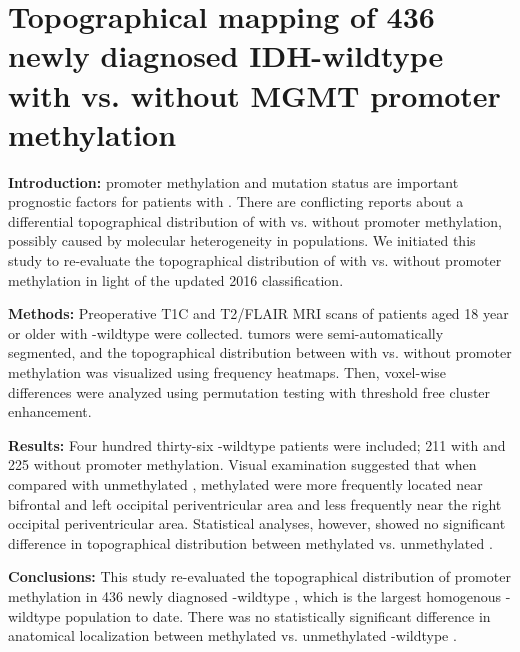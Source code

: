 \chapter[Topographical mapping of 436 newly diagnosed IDH-wildtype glioblastoma with vs. without MGMT promoter methylation][Glioblastoma topographical mapping]{Topographical mapping of 436 newly diagnosed IDH-wildtype  with vs. without MGMT promoter methylation}\label{chap:HGGLocation}


\begin{ChapterAbstract}
    \textbf{Introduction:}  promoter methylation and  mutation status are important prognostic factors for patients with .
    There are conflicting reports about a differential topographical distribution of  with vs. without  promoter methylation, possibly caused by molecular heterogeneity in  populations.
    We initiated this study to re-evaluate the topographical distribution of  with vs. without  promoter methylation in light of the updated  2016 classification.

    \textbf{Methods:} Preoperative \acrlong{T1C} and \acrlong{T2}/\acrlong{FLAIR} \acrlong{MRI} scans of patients aged 18 year or older with -wildtype  were collected.
    \Glspl{tumor} were semi-automatically segmented, and the topographical distribution between  with vs. without  promoter methylation was visualized using frequency heatmaps.
    Then, voxel-wise differences were analyzed using permutation testing with threshold free cluster enhancement.

    \textbf{Results:} Four hundred thirty-six -wildtype  patients were included; 211 with and 225 without  promoter methylation.
    Visual examination suggested that when compared with  unmethylated ,  methylated  were more frequently located near bifrontal and left occipital periventricular area and less frequently near the right occipital periventricular area.
    Statistical analyses, however, showed no significant difference in topographical distribution between  methylated vs.  unmethylated .

    \textbf{Conclusions:} This study re-evaluated the topographical distribution of  promoter methylation in 436 newly diagnosed -wildtype , which is the largest homogenous -wildtype  population to date.
    There was no statistically significant difference in anatomical localization between  methylated vs. unmethylated -wildtype .
\end{ChapterAbstract}

